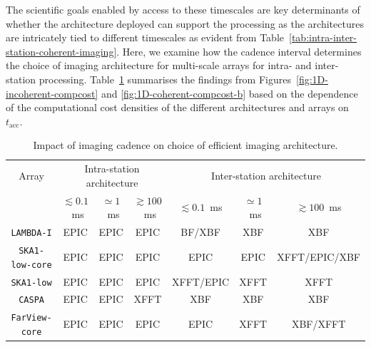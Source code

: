 \documentclass[
  journal=pasa,
  manuscript=article-type,
  year=2020,
  volume=37,
]{cup-journal}
\begin{document}
The scientific goals enabled by access to these timescales are key determinants of whether the architecture deployed can support the processing as the architectures are intricately tied to different timescales as evident from Table~\ref{tab:intra-inter-station-coherent-imaging}. Here, we examine how the cadence interval determines the choice of imaging architecture for multi-scale arrays for intra- and inter-station processing. Table~\ref{tab:cadence} summarises the findings from Figures~\ref{fig:1D-incoherent-compcost} and \ref{fig:1D-coherent-compcost-b} based on the dependence of the computational cost densities of the different architectures and arrays on $t_\textrm{acc}$.

\begin{table}[htb!]
\normalsize
\begin{threeparttable}
\caption{Impact of imaging cadence on choice of efficient imaging architecture.}
\label{tab:cadence}
\begin{tabular}{c|ccc|ccc}
\toprule
\headrow 
Array & \multicolumn{3}{c|}{Intra-station architecture} & \multicolumn{3}{c}{Inter-station architecture} \\ 
 & $\lesssim 0.1$~ms & $\simeq 1$~ms & $\gtrsim 100$~ms & $\lesssim 0.1$~ms & $\simeq 1$~ms & $\gtrsim 100$~ms \\ 
\midrule\midrule

\texttt{LAMBDA-I} & EPIC & EPIC & EPIC & BF/XBF & XBF & XBF \\
\midrule
\texttt{SKA1-low-core} & EPIC & EPIC & EPIC & EPIC & EPIC & XFFT/EPIC/XBF \\
\midrule
\texttt{SKA1-low} & EPIC & EPIC & EPIC & XFFT/EPIC & XFFT & XFFT \\
\midrule
\texttt{CASPA} & EPIC & EPIC & XFFT & XBF & XBF & XBF \\
\midrule
\texttt{FarView-core} & EPIC & EPIC & EPIC & EPIC & XFFT & XBF/XFFT \\
\bottomrule
\end{tabular}
\end{threeparttable}
\end{table}
\end{document}
